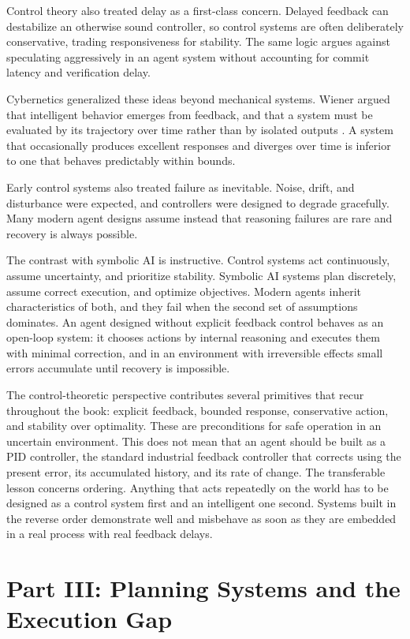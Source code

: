 \documentclass[11pt]{book}
\begin{document}
Control theory also treated delay as a first-class concern. Delayed feedback can destabilize an otherwise sound controller, so control systems are often deliberately conservative, trading responsiveness for stability. The same logic argues against speculating aggressively in an agent system without accounting for commit latency and verification delay.

Cybernetics generalized these ideas beyond mechanical systems. Wiener argued that intelligent behavior emerges from feedback, and that a system must be evaluated by its trajectory over time rather than by isolated outputs \cite{wiener1948cybernetics}. A system that occasionally produces excellent responses and diverges over time is inferior to one that behaves predictably within bounds.

Early control systems also treated failure as inevitable. Noise, drift, and disturbance were expected, and controllers were designed to degrade gracefully. Many modern agent designs assume instead that reasoning failures are rare and recovery is always possible.

The contrast with symbolic AI is instructive. Control systems act continuously, assume uncertainty, and prioritize stability. Symbolic AI systems plan discretely, assume correct execution, and optimize objectives. Modern agents inherit characteristics of both, and they fail when the second set of assumptions dominates. An agent designed without explicit feedback control behaves as an open-loop system: it chooses actions by internal reasoning and executes them with minimal correction, and in an environment with irreversible effects small errors accumulate until recovery is impossible.

The control-theoretic perspective contributes several primitives that recur throughout the book: explicit feedback, bounded response, conservative action, and stability over optimality. These are preconditions for safe operation in an uncertain environment. This does not mean that an agent should be built as a PID controller, the standard industrial feedback controller that corrects using the present error, its accumulated history, and its rate of change. The transferable lesson concerns ordering. Anything that acts repeatedly on the world has to be designed as a control system first and an intelligent one second. Systems built in the reverse order demonstrate well and misbehave as soon as they are embedded in a real process with real feedback delays.

\section{Part III: Planning Systems and the Execution Gap}
\end{document}

